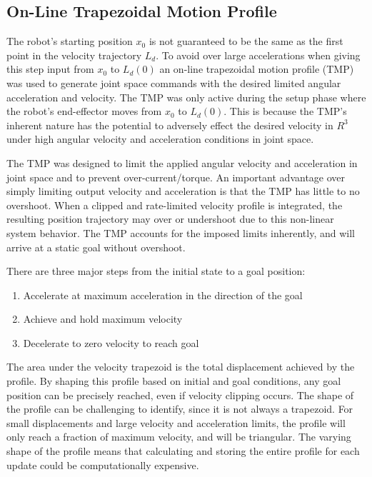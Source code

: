 \subsection{On-Line Trapezoidal Motion Profile}\label{sec:trap}

The robot's starting position $x_0$ is not guaranteed to be the same as the
first point in the velocity trajectory $L_d$.  To avoid over large
accelerations when giving this step input from $x_0$ to $L_d(0)$ an on-line
trapezoidal motion profile (TMP) was used to generate joint space commands with
the desired limited angular acceleration and velocity.  The TMP was only active
during the setup phase where the robot's end-effector moves from $x_0$ to
$L_d(0)$.  This is because the TMP's inherent nature has the potential to adversely effect the desired velocity in $R^3$ under high angular velocity and acceleration conditions in joint space.

The TMP was designed to limit the applied angular velocity and acceleration in
joint space and to prevent over-current/torque. An important advantage over
simply limiting output velocity and acceleration is that the TMP has little to
no overshoot. When a clipped and rate-limited velocity profile is integrated,
the resulting position trajectory may over or undershoot due to this non-linear
system behavior.  The TMP accounts for the imposed limits inherently, and will
arrive at a static goal without overshoot.

There are three major steps from the initial state to a goal position:

\begin{enumerate}
\item Accelerate at maximum acceleration in the direction of the goal
\item Achieve and hold maximum velocity
\item Decelerate to zero velocity to reach goal
\end{enumerate}

The area under the velocity trapezoid is the total displacement achieved by the
profile. By shaping this profile based on initial and goal conditions, any
goal position can be precisely reached, even if velocity clipping occurs. The
shape of the profile can be challenging to identify, since it is not
always a trapezoid. For small displacements and large velocity and acceleration
limits, the profile will only reach a fraction of maximum velocity, and will be
triangular. The varying shape of the profile means that calculating and storing
the entire profile for each update could be computationally expensive. 

